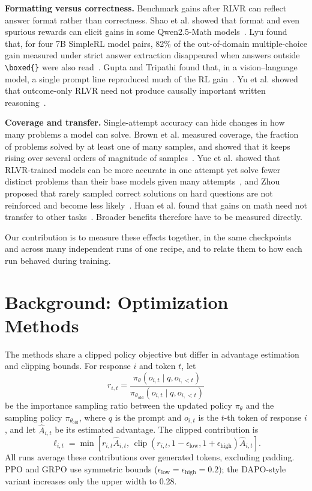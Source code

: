 \documentclass[ai,article,submit,oneauthor]{Definitions/mdpi}
\begin{document}
\noindent\textbf{Formatting versus correctness.}
Benchmark gains after RLVR can reflect answer format rather than correctness. Shao et al. showed that format and even spurious rewards can elicit gains in some Qwen2.5-Math models~\cite{shao2025spurious}. Lyu found that, for four 7B SimpleRL model pairs, 82\% of the out-of-domain multiple-choice gain measured under strict answer extraction disappeared when answers outside \texttt{\textbackslash boxed\{\}} were also read~\cite{lyu2026samebox}. Gupta and Tripathi found that, in a vision--language model, a single prompt line reproduced much of the RL gain~\cite{gupta2026formatcompliance}. Yu et al. showed that outcome-only RLVR need not produce causally important written reasoning~\cite{yu2026outcomerewards}.

\noindent\textbf{Coverage and transfer.}
Single-attempt accuracy can hide changes in how many problems a model can solve. Brown et al. measured coverage, the fraction of problems solved by at least one of many samples, and showed that it keeps rising over several orders of magnitude of samples~\cite{brown2024monkeys}. Yue et al. showed that RLVR-trained models can be more accurate in one attempt yet solve fewer distinct problems than their base models given many attempts~\cite{yue2025reasoningcapacity}, and Zhou proposed that rarely sampled correct solutions on hard questions are not reinforced and become less likely~\cite{zhou2026passkinversion}. Huan et al. found that gains on math need not transfer to other tasks~\cite{huan2025transferability}. Broader benefits therefore have to be measured directly.

Our contribution is to measure these effects together, in the same checkpoints and across many independent runs of one recipe, and to relate them to how each run behaved during training.

\section{Background: Optimization Methods}\label{sec:method}

The methods share a clipped policy objective but differ in advantage estimation and clipping bounds. For response $i$ and token $t$, let
\begin{equation}\label{eq:ratio}
r_{i,t}=\frac{\pi_\theta(o_{i,t}\mid q,o_{i,<t})}{\pi_{\theta_{\mathrm{old}}}(o_{i,t}\mid q,o_{i,<t})}
\end{equation}
be the importance sampling ratio between the updated policy $\pi_\theta$ and the sampling policy $\pi_{\theta_{\mathrm{old}}}$, where $q$ is the prompt and $o_{i,t}$ is the $t$-th token of response $i$, and let $\widehat{A}_{i,t}$ be its estimated advantage. The clipped contribution is
\begin{equation}\label{eq:ppo_objective}
\ell_{i,t}=\min\!\left[r_{i,t}\widehat{A}_{i,t},\,
\operatorname{clip}(r_{i,t},1-\epsilon_{\mathrm{low}},1+\epsilon_{\mathrm{high}})\widehat{A}_{i,t}\right].
\end{equation}
All runs average these contributions over generated tokens, excluding padding. PPO and GRPO use symmetric bounds ($\epsilon_{\mathrm{low}}=\epsilon_{\mathrm{high}}=0.2$); the DAPO-style variant increases only the upper width to 0.28.
\end{document}
